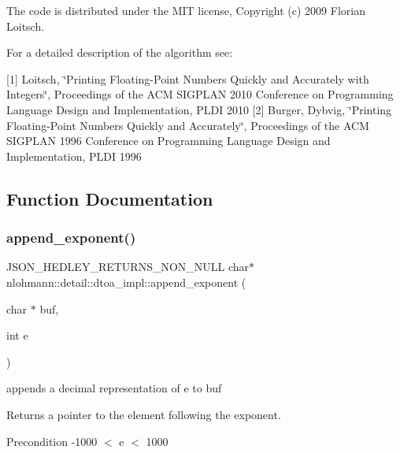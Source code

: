 The code is distributed under the M\+IT license, Copyright (c) 2009 Florian Loitsch.

For a detailed description of the algorithm see\+:

\mbox{[}1\mbox{]} Loitsch, \char`\"{}\+Printing Floating-\/\+Point Numbers Quickly and Accurately with
    Integers\char`\"{}, Proceedings of the A\+CM S\+I\+G\+P\+L\+AN 2010 Conference on Programming Language Design and Implementation, P\+L\+DI 2010 \mbox{[}2\mbox{]} Burger, Dybvig, \char`\"{}\+Printing Floating-\/\+Point Numbers Quickly and Accurately\char`\"{}, Proceedings of the A\+CM S\+I\+G\+P\+L\+AN 1996 Conference on Programming Language Design and Implementation, P\+L\+DI 1996 

\subsection{Function Documentation}
\mbox{\label{namespacenlohmann_1_1detail_1_1dtoa__impl_ad90f19ed10d8133b727df4b9bc5ddf5c}} 
\subsubsection{\texorpdfstring{append\+\_\+exponent()}{append\_exponent()}}
{\footnotesize\ttfamily J\+S\+O\+N\+\_\+\+H\+E\+D\+L\+E\+Y\+\_\+\+R\+E\+T\+U\+R\+N\+S\+\_\+\+N\+O\+N\+\_\+\+N\+U\+LL char$\ast$ nlohmann\+::detail\+::dtoa\+\_\+impl\+::append\+\_\+exponent (\begin{DoxyParamCaption}\item[{char $\ast$}]{buf,  }\item[{int}]{e }\end{DoxyParamCaption})\hspace{0.3cm}{\ttfamily [inline]}}



appends a decimal representation of e to buf 

\begin{DoxyReturn}{Returns}
a pointer to the element following the exponent. 
\end{DoxyReturn}
\begin{DoxyPrecond}{Precondition}
-\/1000 $<$ e $<$ 1000 
\end{DoxyPrecond}
\mbox{\label{namespacenlohmann_1_1detail_1_1dtoa__impl_a22b6e37654ac93c6d0d9c06ec1bf5ded}} 
